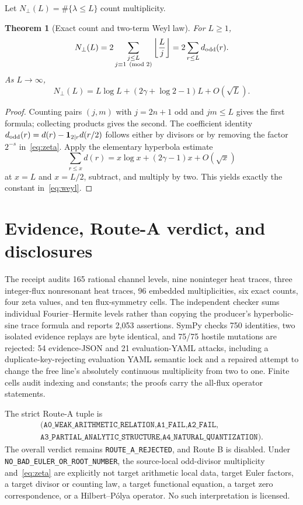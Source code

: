 \documentclass[10pt]{article}
\newtheorem{theorem}{Theorem}
\newcommand{\one}{\mathbf 1}
\begin{document}
Let $N_\perp(L)=\#\{\lambda\leq L\}$ count multiplicity.
\begin{theorem}[Exact count and two-term Weyl law]\label{thm:weyl}
For $L\geq1$,
\begin{equation}\label{eq:count}
 N_\perp(L)=2\sum_{\substack{j\leq L\\j\equiv1\pmod 2}}
 \left\lfloor\frac Lj\right\rfloor
 =2\sum_{r\leq L}d_{\rm odd}(r).
\end{equation}
As $L\to\infty$,
\begin{equation}\label{eq:weyl}
 N_\perp(L)=L\log L+(2\gamma+\log2-1)L+O(\sqrt L).
\end{equation}
\end{theorem}
\begin{proof}
Counting pairs $(j,m)$ with $j=2n+1$ odd and $jm\leq L$ gives the first
formula; collecting products gives the second.  The coefficient identity
$d_{\rm odd}(r)=d(r)-\one_{2\mid r}d(r/2)$ follows either by divisors or by
removing the factor $2^{-s}$ in~\eqref{eq:zeta}.  Apply the elementary
hyperbola estimate
\[
 \sum_{r\leq x}d(r)=x\log x+(2\gamma-1)x+O(\sqrt x)
\]
at $x=L$ and $x=L/2$, subtract, and multiply by two.  This yields exactly
the constant in~\eqref{eq:weyl}.
\end{proof}

\section{Evidence, Route-A verdict, and disclosures}
The receipt audits 165 rational channel levels, nine noninteger heat traces,
three integer-flux nonresonant heat traces, 96 embedded multiplicities, six
exact counts, four zeta values, and ten flux-symmetry cells.  The independent
checker sums individual Fourier--Hermite levels rather than copying the
producer's hyperbolic-sine trace formula and reports 2,053 assertions.
SymPy checks 750 identities, two isolated evidence replays are byte
identical, and 75/75 hostile mutations are rejected: 54 evidence-JSON and 21
evaluation-YAML attacks, including a duplicate-key-rejecting evaluation YAML
semantic lock and a repaired attempt to change the free line's absolutely
continuous multiplicity from two to one.  Finite cells audit indexing and
constants; the proofs carry the all-flux operator statements.

The strict Route-A tuple is
\[
 \begin{gathered}
 \texttt{(A0\_WEAK\_ARITHMETIC\_RELATION,A1\_FAIL,A2\_FAIL,}\\
 \texttt{A3\_PARTIAL\_ANALYTIC\_STRUCTURE,}
 \texttt{A4\_NATURAL\_QUANTIZATION)}.
 \end{gathered}
\]
The overall verdict remains \texttt{ROUTE\_A\_REJECTED}, and Route B is
disabled.  Under \texttt{NO\_BAD\_EULER\_OR\_ROOT\_NUMBER}, the
source-local odd-divisor multiplicity and~\eqref{eq:zeta} are explicitly not
target arithmetic local data, target Euler factors, a target divisor or
counting law, a target functional equation, a target zero correspondence,
or a Hilbert--P\'olya operator.  No such interpretation is licensed.
\end{document}
